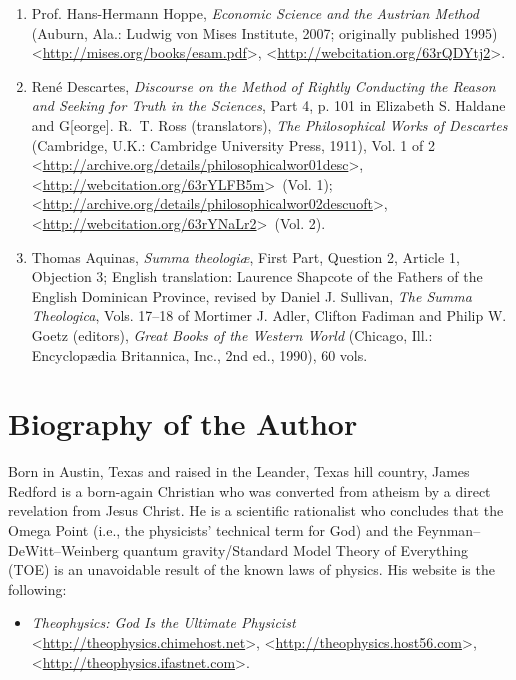 \documentclass[letterpaper,12pt]{article}
\begin{document}
\begin{enumerate}
\small
\item Prof. Hans-Hermann Hoppe, \emph{Economic Science and the Austrian Method} (Auburn, Ala.: Ludwig von Mises Institute, 2007; originally published 1995) \textless\url{http://mises.org/books/esam.pdf}\textgreater , \textless\url{http://webcitation.org/63rQDYtj2}\textgreater .

\item Ren\'{e} Descartes, \emph{Discourse on the Method of Rightly Conducting the Reason and Seeking for Truth in the Sciences}, Part 4, p. 101 in Elizabeth S. Haldane and G[eorge]. R.~T. Ross (translators), \emph{The Philosophical Works of Descartes} (Cambridge, U.K.: Cambridge University Press, 1911), Vol. 1 of 2 \textless\href{http://archive.org/details/philosophicalwor01desc}{\textsf{http://\discretionary{}{}{}archive\discretionary{}{}{}.org/\discretionary{}{}{}details/\discretionary{}{}{}philosophicalwor\discretionary{}{}{}01desc}}\textgreater , \textless\url{http://webcitation.org/63rYLFB5m}\textgreater\ (Vol. 1); \textless\url{http://archive.org/details/philosophicalwor02descuoft}\textgreater , \textless\url{http://webcitation.org/63rYNaLr2}\textgreater\ (Vol. 2).

\item Thomas Aquinas, \emph{Summa theologi\ae}, First Part, Question 2, Article 1, Objection 3; English translation: Laurence Shapcote of the Fathers of the English Dominican Province, revised by Daniel J. Sullivan, \emph{The Summa Theologica}, Vols. 17--18 of Mortimer J. Adler, Clifton Fadiman and Philip W. Goetz (editors), \emph{Great Books of the Western World} (Chicago, Ill.: Encyclop\ae dia Britannica, Inc., 2nd ed., 1990), 60 vols.
\end{enumerate}

\section{Biography of the Author}
\label{sec:BiographyOfTheAuthor}

Born in Austin, Texas and raised in the Leander, Texas hill country, James Redford is a born-again Christian who was converted from atheism by a direct revelation from Jesus Christ. He is a scientific rationalist who concludes that the Omega Point (i.e., the physicists' technical term for God) and the Feynman--DeWitt--Weinberg quantum gravity\slash Standard Model Theory of Everything (TOE) is an unavoidable result of the known laws of physics. His website is the following:

\begin{itemize}
\small
\item \emph{Theophysics: God Is the Ultimate Physicist} \textless\url{http://theophysics.chimehost.net}\textgreater  , \textless\url{http://theophysics.host56.com}\textgreater , \textless\url{http://theophysics.ifastnet.com}\textgreater .
\end{itemize}
\end{document}

